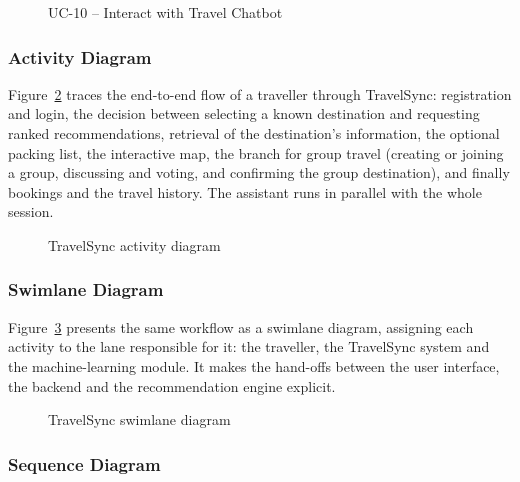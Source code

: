 \begin{figure}[htbp]
  \centering
  \caption{UC-10 -- Interact with Travel Chatbot}
  \label{fig:uc10}
\end{figure}

\subsubsection{Activity Diagram}

Figure~\ref{fig:activity} traces the end-to-end flow of a traveller through
TravelSync: registration and login, the decision between selecting a known
destination and requesting ranked recommendations, retrieval of the
destination's information, the optional packing list, the interactive map,
the branch for group travel (creating or joining a group, discussing and
voting, and confirming the group destination), and finally bookings and the
travel history. The assistant runs in parallel with the whole session.

\begin{figure}[htbp]
  \centering
  \caption{TravelSync activity diagram}
  \label{fig:activity}
\end{figure}

\subsubsection{Swimlane Diagram}

Figure~\ref{fig:swimlane} presents the same workflow as a swimlane diagram,
assigning each activity to the lane responsible for it: the traveller, the
TravelSync system and the machine-learning module. It makes the hand-offs
between the user interface, the backend and the recommendation engine
explicit.

\begin{figure}[htbp]
  \centering
  \caption{TravelSync swimlane diagram}
  \label{fig:swimlane}
\end{figure}

\subsubsection{Sequence Diagram}

